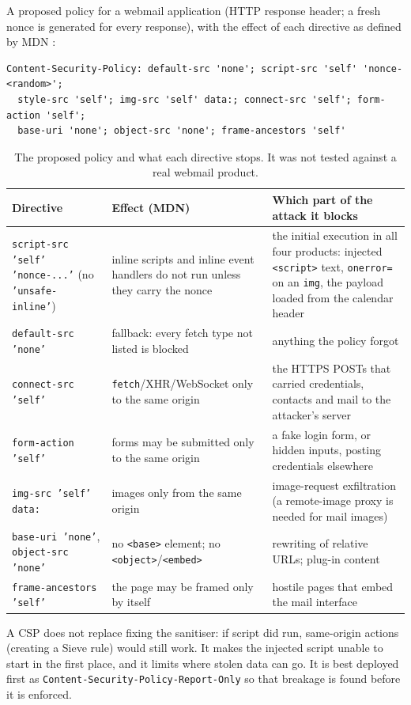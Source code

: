 \documentclass[11pt,a4paper]{article}
\newcommand{\code}[1]{\texttt{#1}}
\begin{document}
A proposed policy for a webmail application (HTTP response header; a fresh nonce is generated for every response), with the
effect of each directive as defined by MDN \cite{mdn}:
\begin{Verbatim}[fontsize=\footnotesize, frame=single]
Content-Security-Policy: default-src 'none'; script-src 'self' 'nonce-<random>';
  style-src 'self'; img-src 'self' data:; connect-src 'self'; form-action 'self';
  base-uri 'none'; object-src 'none'; frame-ancestors 'self'
\end{Verbatim}
\begin{table}[H]
\centering\small
\begin{tabularx}{\textwidth}{@{}P{3.4cm}LL@{}}
\toprule
Directive & Effect (MDN) & Which part of the attack it blocks \\
\midrule
\code{script-src 'self' 'nonce-...'} (no \code{'unsafe-inline'}) & inline scripts and inline event handlers do not run
unless they carry the nonce & the initial execution in all four products: injected \code{<script>} text, \code{onerror=} on an
\code{img}, the payload loaded from the calendar header \\
\code{default-src 'none'} & fallback: every fetch type not listed is blocked & anything the policy forgot \\
\code{connect-src 'self'} & \code{fetch}/XHR/WebSocket only to the same origin & the HTTPS POSTs that carried credentials, contacts and mail to the
attacker's server \\
\code{form-action 'self'} & forms may be submitted only to the same origin & a fake login form, or hidden inputs, posting
credentials elsewhere \\
\code{img-src 'self' data:} & images only from the same origin & image-request exfiltration (a remote-image proxy is needed for mail images) \\
\code{base-uri 'none'}, \code{object-src 'none'} & no \code{<base>} element; no \code{<object>}/\code{<embed>} & rewriting of relative URLs; plug-in content \\
\code{frame-ancestors 'self'} & the page may be framed only by itself & hostile pages that embed the mail interface \\
\bottomrule
\end{tabularx}
\caption{The proposed policy and what each directive stops. It was not tested against a real webmail product.}\label{tab:csp}
\end{table}
A CSP does not replace fixing the sanitiser: if script did run, same-origin actions (creating a Sieve rule) would still work.
It makes the injected script unable to start in the first place, and it limits where stolen data can go. It is best
deployed first as \code{Content-Security-Policy-Report-Only} so that breakage is found before it is enforced.
\end{document}
